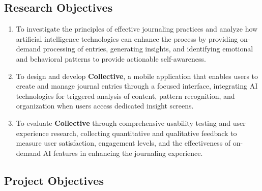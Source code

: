 \subsection{Research Objectives}\label{subsec:research-objectives}

\begin{enumerate}
	\item To investigate the principles of effective journaling practices and analyze how artificial intelligence technologies can enhance the process by providing on-demand processing of entries, generating insights, and identifying emotional and behavioral patterns to provide actionable self-awareness.
	
	\item To design and develop \textbf{Collective}, a mobile application that enables users to create and manage journal entries through a focused interface, integrating AI technologies for triggered analysis of content, pattern recognition, and organization when users access dedicated insight screens.
	
	\item To evaluate \textbf{Collective} through comprehensive usability testing and user experience research, collecting quantitative and qualitative feedback to measure user satisfaction, engagement levels, and the effectiveness of on-demand AI features in enhancing the journaling experience.
\end{enumerate}

\subsection{Project Objectives}\label{subsec:project-objectives}

